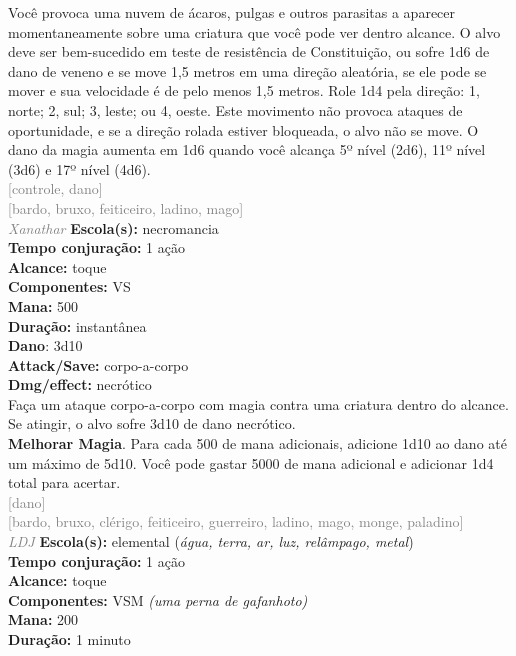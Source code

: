 \documentclass{RPG_Adventure}[2021/10/20]
\begin{document}
{\normalsize Você provoca uma nuvem de ácaros, pulgas e outros parasitas a aparecer momentaneamente sobre uma criatura que você pode ver dentro alcance. O alvo deve ser bem-sucedido em teste de resistência de  Constituição, ou sofre 1d6 de dano de veneno e se move 1,5 metros em uma direção aleatória, se ele pode se mover e sua velocidade é de pelo menos 1,5 metros. Role 1d4 pela direção: 1, norte; 2, sul; 3, leste; ou 4, oeste. Este movimento não provoca ataques de oportunidade, e se a direção rolada estiver bloqueada, o alvo não se move. O dano da magia aumenta em 1d6 quando você alcança 5º nível (2d6), 11º nível (3d6) e 17º nível (4d6).\\}
{\scriptsize \textcolor{gray}{[controle, dano]\\}}
{\scriptsize \textcolor{gray}{[bardo, bruxo, feiticeiro, ladino, mago]\\}}
{\tiny \textcolor{gray}{\textit{Xanathar}}}
{\small \t \textbf{Escola(s):} necromancia\\\t \textbf{Tempo conjuração:} 1 ação\\\t \textbf{Alcance:} toque\\\t \textbf{Componentes:} VS\\\t \textbf{Mana:} 500\\\t \textbf{Duração:} instantânea\\\t \textbf{Dano}: 3d10\\\t \textbf{Attack/Save:} corpo-a-corpo\\\t \textbf{Dmg/effect:} necrótico\\}
{\normalsize Faça um ataque corpo-a-corpo com magia contra uma criatura dentro do alcance. Se atingir, o alvo sofre 3d10 de dano necrótico.\\\t \textbf{Melhorar Magia}. Para cada 500 de mana adicionais, adicione 1d10 ao dano até um máximo de 5d10. Você pode gastar 5000 de mana adicional e adicionar 1d4 total para acertar.\\}
{\scriptsize \textcolor{gray}{[dano]\\}}
{\scriptsize \textcolor{gray}{[bardo, bruxo, clérigo, feiticeiro, guerreiro, ladino, mago, monge, paladino]\\}}
{\tiny \textcolor{gray}{\textit{LDJ}}}
{\small \t \textbf{Escola(s):} elemental (\textit{água, terra, ar, luz, relâmpago, metal})\\\t \textbf{Tempo conjuração:} 1 ação\\\t \textbf{Alcance:} toque\\\t \textbf{Componentes:} VSM \textit{(uma perna de gafanhoto)}\\\t \textbf{Mana:} 200\\\t \textbf{Duração:} 1 minuto\\}
\end{document}
